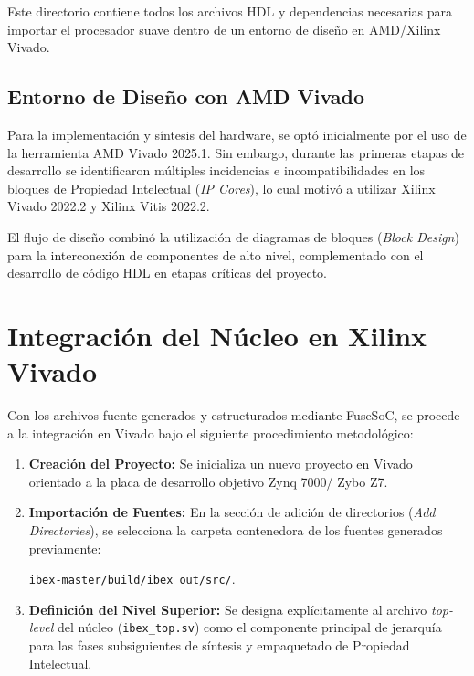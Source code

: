 Este directorio contiene todos los archivos HDL y dependencias necesarias para importar el procesador suave dentro de un entorno de diseño en AMD/Xilinx Vivado.


\subsection{Entorno de Diseño con AMD Vivado}
Para la implementación y síntesis del hardware, se optó inicialmente por el uso de la herramienta AMD Vivado 2025.1. Sin embargo, durante las primeras etapas de desarrollo se identificaron múltiples incidencias e incompatibilidades en los bloques de Propiedad Intelectual (\textit{IP Cores}), lo cual motivó a utilizar Xilinx Vivado 2022.2 y Xilinx Vitis 2022.2.


El flujo de diseño combinó la utilización de diagramas de bloques (\textit{Block Design}) para la interconexión de componentes de alto nivel, complementado con el desarrollo de código HDL en etapas críticas del proyecto.

\section{Integración del Núcleo en Xilinx Vivado}
Con los archivos fuente generados y estructurados mediante FuseSoC, se procede a la integración en Vivado bajo el siguiente procedimiento metodológico:

\begin{enumerate}
    \item \textbf{Creación del Proyecto:} Se inicializa un nuevo proyecto en Vivado orientado a la placa de desarrollo objetivo Zynq 7000/ Zybo Z7.
    \item \textbf{Importación de Fuentes:} En la sección de adición de directorios (\textit{Add Directories}), se selecciona la carpeta contenedora de los fuentes generados previamente:
    
    \texttt{ibex-master/build/ibex\_out/src/}.
    
    \item \textbf{Definición del Nivel Superior:} Se designa explícitamente al archivo \textit{top-level} del núcleo (\texttt{ibex\_top.sv}) como el componente principal de jerarquía para las fases subsiguientes de síntesis y empaquetado de Propiedad Intelectual.
\end{enumerate}

